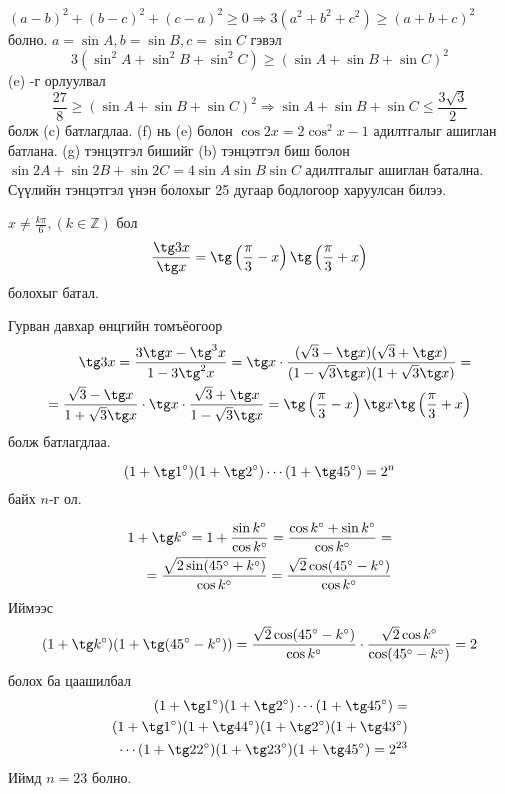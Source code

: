 \documentclass[10pt,a4paper,oneside]{book}
\begin{document}
$(a-b)^2 + (b-c)^2 + (c-a)^2 \geq 0 \Rightarrow 3(a^2+b^2 + c^2) \geq (a+b+c)^2$  болно. $a=\sin A, b=\sin B, c= \sin C$ гэвэл
\begin{equation*}
3(\sin^2 A + \sin^2 B + \sin^2 C) \geq (\sin A + \sin B + \sin C)^2
\end{equation*}
(e) -г орлуулвал
\begin{equation*}
\frac{27}{8} \geq (\sin A + \sin B + \sin C)^2 \Rightarrow \sin A + \sin B + \sin C \leq \frac{3\sqrt{3}}{2}
\end{equation*}
болж (c) батлагдлаа. (f) нь (e) болон $\cos 2x = 2\cos^2 x -1$ адилтгалыг ашиглан батлана. (g) тэнцэтгэл бишийг (b) тэнцэтгэл биш болон $\sin 2A + \sin 2B + \sin 2C = 4\sin A\sin B \sin C$ адилтгалыг ашиглан батална. Сүүлийн тэнцэтгэл үнэн болохыг 25 дугаар бодлогоор харуулсан билээ.


\Problem
$x \neq \frac{k\pi}{6}, (k \in \mathbb{Z})$ бол 
\begin{equation*}
\frac{\tg 3x}{\tg x} = \tg \left(\frac{\pi}{3}-x \right)\tg \left(\frac{\pi}{3} + x\right)
\end{equation*}
болохыг батал.

\TheSolution
Гурван давхар өнцгийн томъёогоор
\begin{align*}
\tg 3x = \frac{3\tg x - \tg^3 x}{1-3\tg^2 x} = \tg x \cdot \frac{(\sqrt{3}-\tg x)(\sqrt{3}+\tg x)}{(1-\sqrt{3}\tg x)(1+\sqrt{3}\tg x)} = \\
= \frac{\sqrt{3}-\tg x}{1+\sqrt{3}\tg x}\cdot\tg x\cdot \frac{\sqrt{3}+\tg x}{1-\sqrt{3}\tg x} =
\tg \left(\frac{\pi}{3}-x\right)\tg x \tg \left(\frac{\pi}{3} + x\right)
\end{align*}
болж батлагдлаа.

\Problem
[AMC12P 2002]
\begin{equation*}
(1+\tg 1^\circ)(1+\tg 2^\circ)\cdots(1+\tg 45^\circ) = 2^n
\end{equation*}
байх $n$-г ол.

\ASolution
\begin{align*}
1+\tg k^\circ = 1+\frac{\sin k^\circ}{\cos k^\circ} = \frac{\cos k^\circ + \sin k^\circ}{\cos k^\circ} = \\
= \frac{\sqrt{2\sin(45^\circ + k^\circ)}}{\cos k^\circ} = \frac{\sqrt{2}\cos(45^\circ-k^\circ)}{\cos k^\circ}
\end{align*}
Иймээс
\begin{align*}
(1+\tg k^\circ)(1+\tg(45^\circ-k^\circ)) = \frac{\sqrt{2}\cos(45^\circ - k^\circ)}{\cos k^\circ}\cdot \frac{\sqrt{2}\cos k^\circ}{\cos (45^\circ - k^\circ)} = 2
\end{align*}
болох ба цаашилбал
\begin{align*}
(1+\tg 1^\circ)(1+\tg 2^\circ)\cdots(1+\tg 45^\circ) =\\
(1+\tg 1^\circ)(1+\tg 44^\circ)(1+\tg 2^\circ)(1+\tg 43^\circ)\\
\cdots(1+\tg 22^\circ)(1+\tg 23^\circ)(1+\tg 45^\circ) = 2^{23}
\end{align*}
Иймд $n=23$ болно.
\end{document}
